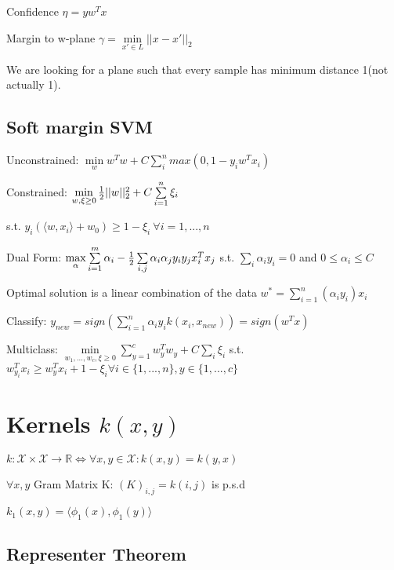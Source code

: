 \documentclass[11pt,twocolumn]{article}
\begin{document}
Confidence $\eta = y w^T x$

Margin to w-plane $\gamma = \min \limits_{x' \in L} ||x-x'||_2 $

We are looking for a plane such that every sample has minimum distance 1(not actually 1).


\subsection{Soft margin SVM}

Unconstrained: $\min \limits_w w^Tw + C \sum \limits_i^n max\left(0, 1-y_iw^Tx_i\right)$


Constrained: $\min \limits_{w, \xi \geq	 0} {{1 \over 2} ||w||_2^2 + C \sum \limits_{i=1}^n {\xi_i}}$ 

s.t. $ y_i \left( \langle w, x_i \rangle + w_0 \right) \geq 1 - \xi_i ~ \forall i = 1,...,n$


Dual Form: $ \max \limits_{\alpha} \sum \limits_{i=1}^m \alpha_i - {1 \over 2} \sum \limits_{i,j} \alpha_i \alpha_j y_i y_j x_i^T x_j$ s.t. $\sum \limits_i \alpha_i y_i  = 0$ and $0 \leq \alpha_i \leq C$


Optimal solution is a linear combination of the data $w^* = \sum \limits_{i=1}^n \left( \alpha_i y_i \right) x_i$

Classify: $y_{new} 
= sign(  \sum \limits_{i=1}^n \alpha_i y_i  k(x_i, x_{new}))
= sign(w^Tx)$


Multiclass: $ \min \limits_{w_1,...,w_c, \xi \geq 0} \sum \limits_{y=1}^{c}w_y^Tw_y + C \sum \limits_{i} \xi_i$ s.t. $w_{y_i}^Tx_i \geq w_y^T x_i + 1 - \xi_i \forall i \in \lbrace1,...,n\rbrace, y \in \lbrace1,...,c\rbrace$

\section{Kernels $k(x,y)$}

$k: \mathcal{X} \times \mathcal{X} \rightarrow \mathbb{R}  \Leftrightarrow \forall x,y \in \mathcal{X} : k\left( x , y \right) = k \left(y,x\right)$

$\forall x, y$
Gram Matrix K: $(K)_{i,j} = k(i,j)$ is p.s.d

$k_1(x,y) = \langle \phi_1(x), \phi_1(y) \rangle $

\subsection{Representer Theorem}
\end{document}
